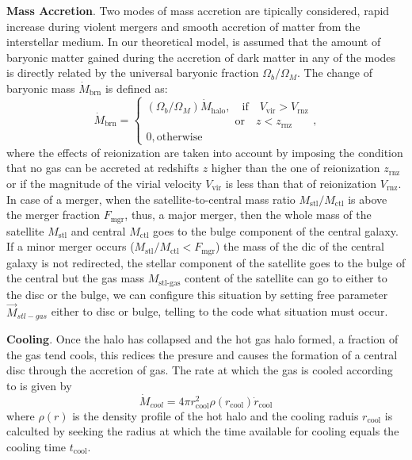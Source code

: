 \documentclass[usenatbib]{mn2e}
\begin{document}
\textbf{Mass Accretion}. 
Two modes of mass accretion are tipically considered, rapid increase during violent mergers and  smooth accretion of matter from the interstellar medium.
 In our theoretical model, is assumed that the amount of baryonic matter gained during the accretion of dark matter in any of the modes  is directly related by the universal baryonic 
fraction $\Omega_b/\Omega_M$. The change of baryonic mass  $\dot{M}_{\text{brn}}$ is defined as:
\begin{equation}
 \dot{M}_{\text{brn}}=
\begin{cases}
 (\Omega_b/\Omega_M)\dot{M}_{\text{halo}},\quad \text{if} \quad V_{\text{vir}}>V_{\text{rnz}}\\
\qquad \qquad \qquad \qquad \text{or} \quad z<z_{\text{rnz}}\\
0, \text{otherwise}
\end{cases},
\end{equation}
where the effects of reionization are taken into account by  imposing the condition that no gas can be accreted at  redshifts $z$ higher than the one of 
reionization $z_{\text{rnz}}$ or if the magnitude of the virial velocity $V_{\text{vir}}$ is less than that of reionization $V_{\text{rnz}}$. 
In case of a merger, when the satellite-to-central mass ratio $M_{\text{stl}}/M_{\text{ctl}}$ is above the merger fraction $F_{\text{mgr}}$, thus, a major merger, then 
the whole mass of the satellite $M_{\text{stl}}$ and central $M_{\text{ctl}}$ goes to the bulge component of the central galaxy.
If a minor merger occurs ($M_{\text{stl}}/M_{\text{ctl}}<F_{\text{mgr}}$) the mass of the dic of the central galaxy is not redirected, the stellar component of the satellite goes
to the bulge of the central but the gas mass $M_{\text{stl-gas}}$ content  of the satellite can go to either to the disc or the bulge, we can configure this situation by setting free 
parameter $\vec{M}_{stl-gas}$ either to disc or bulge, telling to the code what situation must occur.

\textbf{Cooling}. Once the halo has collapsed and the hot gas halo formed, a fraction of the gas tend cools, this redices the presure and causes the formation of a central disc through
the accretion of gas. The rate at which the gas is cooled according to \cite{1991ApJ...379...52W} is given by
\begin{equation}
 \dot{M}_{cool}=4\pi r^2_{\text{cool}} \rho (r_{\text{cool}}) \dot{r}_{\text{cool}}
\end{equation}
where  $\rho(r)$ is the density profile of the hot halo and the cooling raduis $r_{\text{cool}}$ is calculted by seeking the radius at which the 
time available for cooling equals the cooling time $t_{\text{cool}}$. 
\end{document}
